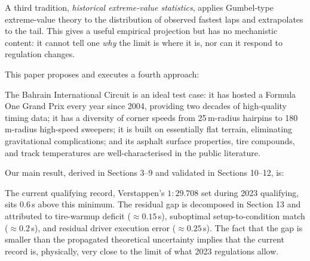 \documentclass[11pt,twocolumn]{article}
\theoremstyle{definition}
\theoremstyle{remark}
\begin{document}
A third tradition, \emph{historical extreme-value statistics}, applies
Gumbel-type extreme-value theory to the distribution of observed fastest
laps and extrapolates to the tail. This gives a useful empirical projection
but has no mechanistic content: it cannot tell one \emph{why} the limit is
where it is, nor can it respond to regulation changes.

This paper proposes and executes a fourth approach:
\begin{center}
\end{center}

\noindent
The Bahrain International Circuit is an ideal test case: it has hosted a
Formula One Grand Prix every year since 2004, providing two decades of
high-quality timing data; it has a diversity of corner speeds from
25\,m-radius hairpins to 180\,m-radius high-speed sweepers; it is built on
essentially flat terrain, eliminating gravitational complications; and its
asphalt surface properties, tire compounds, and track temperatures are
well-characterised in the public literature.

Our main result, derived in Sections 3--9 and validated in Sections 10--12, is:

\begin{center}
\end{center}

\noindent
The current qualifying record, Verstappen's $1\!:\!29.708$ set during 2023
qualifying, sits 0.6\,s above this minimum. The residual gap is decomposed in
Section 13 and attributed to tire-warmup deficit ($\approx 0.15$\,s),
suboptimal setup-to-condition match ($\approx 0.2$\,s), and residual driver
execution error ($\approx 0.25$\,s). The fact that the gap is smaller than the
propagated theoretical uncertainty implies that the current record is,
physically, very close to the limit of what 2023 regulations allow.
\end{document}
